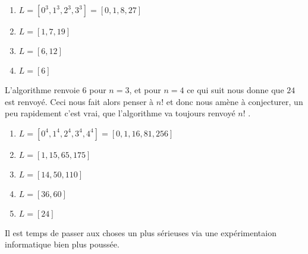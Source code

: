 \begin{enumerate}
	\item $L = [0^3 , 1^3 , 2^3 , 3^3] = [0 , 1 , 8 , 27]$

	\item $L = [1 , 7 , 19]$

	\item $L = [6, 12]$

	\item $L = [6]$
\end{enumerate}


L'algorithme renvoie $6$ pour $n = 3$, et pour $n= 4$ ce qui suit nous donne que $24$ est renvoyé. Ceci nous fait alors penser à $n !$ et donc nous amène à conjecturer, un peu rapidement c'est vrai, que l'algorithme va toujours renvoyé $n !$ .

\begin{enumerate}
	\item $L = [0^4 , 1^4 , 2^4 , 3^4, 4^4] = [0 , 1 , 16 , 81 ,256]$

	\item $L = [1 , 15 , 65 , 175]$

	\item $L = [14, 50 , 110]$

	\item $L = [36 , 60]$

	\item $L = [24]$
\end{enumerate}


Il est temps de passer aux choses un plus sérieuses via une expérimentaion informatique bien plus poussée.
